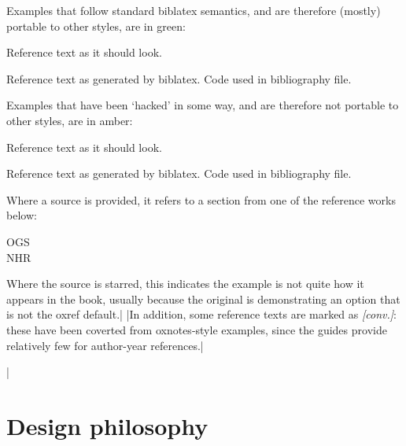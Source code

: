 \documentclass[extrafontsizes,11pt,a4paper,oneside]{memoir}
\newcommand{\booksym}{\makebox[1em][c]{\faicon{book}}}
\newcommand{\cogsym}{\makebox[1em][c]{\faicon{cog}}}
\begin{document}
Examples that follow standard \textsf{biblatex} semantics, and are therefore
(mostly) portable to other styles, are in green:

\begin{tcolorbox}%
  [bicolor
  ,colframe = ok
  ,colback = ok!5!white
  ,colbacklower = white
  ,fontlower = \footnotesize\ttfamily
  ,overlay = {\node[anchor=south east,text=teal] at (frame.south east) {Source};}
  ]
  \hangfrom{\booksym\space} Reference text as it should look.\par
  \hangfrom{\cogsym\space} Reference text as generated by \textsf{biblatex}.
  \tcblower
  Code used in bibliography file.
\end{tcolorbox}

Examples that have been ‘hacked’ in some way, and are therefore not portable
to other styles, are in amber:

\begin{tcolorbox}%
  [bicolor
  ,colframe = hacked
  ,colback = hacked!5!white
  ,colbacklower = white
  ,fontlower = \footnotesize\ttfamily
  ,overlay = {\node[anchor=south east,text=teal] at (frame.south east) {Source};}
  ]
  \hangfrom{\booksym\space} Reference text as it should look.\par
  \hangfrom{\cogsym\space} Reference text as generated by \textsf{biblatex}.
  \tcblower
  Code used in bibliography file.
\end{tcolorbox}

Where a source is provided, it refers to a section from one of the reference works below:

\begin{description}
\item[OGS]

\item[NHR]
\end{description}

Where the source is starred, this indicates the example is not quite how it appears in the book,
usually because the original is demonstrating an option that is not the \textsf{oxref} default.|
\todoc[oxyear]|In addition, some reference texts are marked as \emph{[conv.]}:
these have been coverted from \textsf{oxnotes}-style examples,
since the guides provide relatively few for author-year references.|

\todoc|

\section{Design philosophy}
\end{document}
